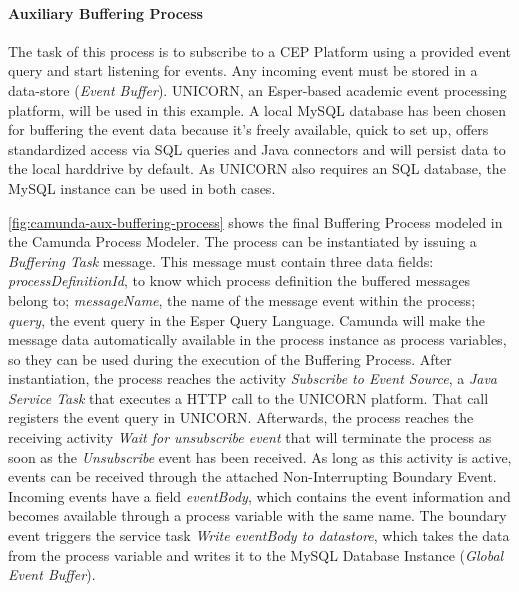 \paragraph{Auxiliary Buffering Process}
The task of this process is to subscribe to a CEP Platform using a provided event query and start listening for events. Any incoming event must be stored in a data-store (\textit{Event Buffer}).
UNICORN, an Esper-based academic event processing platform, will be used in this example.
A local MySQL database has been chosen for buffering the event data because it's freely available, quick to set up, offers standardized access via SQL queries and Java connectors and will persist data to the local harddrive by default. As UNICORN also requires an SQL database, the MySQL instance can be used in both cases.

\autoref{fig:camunda-aux-buffering-process} shows the final Buffering Process modeled in the Camunda Process Modeler. The process can be instantiated by issuing a \textit{Buffering Task} message. This message must contain three data fields: \textit{processDefinitionId}, to know which process definition the buffered messages belong to; \textit{messageName}, the name of the message event within the process; \textit{query}, the event query in the Esper Query Language.
Camunda will make the message data automatically available in the process instance as process variables, so they can be used during the execution of the Buffering Process.
After instantiation, the process reaches the activity \textit{Subscribe to Event Source}, a \textit{Java Service Task} that executes a HTTP call to the UNICORN platform. That call registers the event query in UNICORN. 
Afterwards, the process reaches the receiving activity \textit{Wait for unsubscribe event} that will terminate the process as soon as the \textit{Unsubscribe} event has been received.
As long as this activity is active, events can be received through the attached Non-Interrupting Boundary Event. Incoming events have a field \textit{eventBody}, which contains the event information and becomes available through a process variable with the same name. 
The boundary event triggers the service task \textit{Write eventBody to datastore}, which takes the data from the process variable and writes it to the MySQL Database Instance (\textit{Global Event Buffer}).

